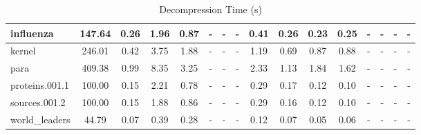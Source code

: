 \begin{table}[]
\begin{tabular}{|l|c|c|c|c|c|c|c|c|c|c|c|c|c|c|c|}
\hline
influenza & 147.64 & 0.26 & 1.96 & 0.87 & - & - & - & 0.41 & 0.26 & 0.23 & 0.25 & - & - & - & - \\
\hline
kernel & 246.01 & 0.42 & 3.75 & 1.88 & - & - & - & 1.19 & 0.69 & 0.87 & 0.88 & - & - & - & - \\
\hline
para & 409.38 & 0.99 & 8.35 & 3.25 & - & - & - & 2.33 & 1.13 & 1.84 & 1.62 & - & - & - & - \\
\hline
proteins.001.1 & 100.00 & 0.15 & 2.21 & 0.78 & - & - & - & 0.29 & 0.17 & 0.12 & 0.10 & - & - & - & - \\
\hline
sources.001.2 & 100.00 & 0.15 & 1.88 & 0.86 & - & - & - & 0.29 & 0.16 & 0.12 & 0.10 & - & - & - & - \\
\hline
world\_leaders & 44.79 & 0.07 & 0.39 & 0.28 & - & - & - & 0.12 & 0.07 & 0.05 & 0.06 & - & - & - & - \\
\hline
\end{tabular}
\caption{Decompression Time (s)}
\label{tab:decompression_time}
\end{table}
